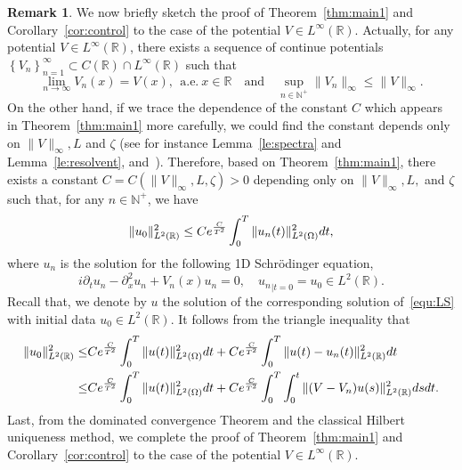 \documentclass[a4paper,reqno]{amsart}
\theoremstyle{definition}
\newtheorem{remark}[theorem]{Remark}
\numberwithin{equation}{section}
\newcommand{\R}{\mathbb{R}}
\def \R {{\mathbb{R} }}
\def \d {{\rm{d}}}
\begin{document}
\begin{remark}\label{remark:infty}
We now briefly sketch the proof of Theorem~\ref{thm:main1} and Corollary~\ref{cor:control} to the case of the potential $V\in L^{\infty}(\R)$.
Actually, for any potential $V\in L^{\infty}(\R)$, there exists a sequence of continue potentials $\left\{V_{n}\right\}_{n=1}^{\infty}\subset C(\R)\cap L^{\infty}(\R)$ such that 
\begin{equation*}
\lim_{n\to \infty}V_{n}(x)=V(x),\ \ \mbox{a.e.}\ x\in \R \quad \mbox{and}\quad \sup_{n\in \mathbb{N^{+}}}\|V_{n}\|_{{\infty}}\le \|V\|_{{\infty}}.
\end{equation*}
On the other hand, if we trace the dependence of the constant $C$ which appears in Theorem~\ref{thm:main1} more carefully, we could find the constant depends only on $\|V\|_{\infty}, L$ and $\zeta$ (see for instance Lemma~\ref{le:spectra} and Lemma~\ref{le:resolvent}, and~\cite[Proposition 4.5]{WANG}). Therefore, based on Theorem~\ref{thm:main1}, there exists a constant $C=C(\|V\|_{\infty},L,\zeta)>0$ depending only on $\|V\|_{\infty},L,$ and $\zeta$ such that, for any $n\in \mathbb{N}^{+}$, we have 
\begin{equation*}
\|u_{0}\|_{L^{2}(\R)}^{2}\le Ce^{\frac{C}{T^{2}}} \int_{0}^{T}\|u_{n}(t)\|_{L^{2}(\Omega)}^{2}\d t,
\end{equation*}
where $u_{n}$ is the solution for the following 1D Schr\"odinger equation,
\begin{equation*}
i\partial_{t}u_{n}-\partial_{x}^{2}u_{n}+V_{n}(x)u_{n}=0,\quad {u_{n}}_{|t=0}=u_{0}\in L^{2}(\R).
\end{equation*}
Recall that, we denote by $u$ the solution of the corresponding solution of~\eqref{equ:LS} with initial data $u_{0}\in L^{2}(\R)$. It follows from the triangle inequality that
\begin{equation*}
\begin{aligned}
\|u_{0}\|_{L^{2}(\R)}^{2}\le 
&Ce^{\frac{C}{T^{2}}} \int_{0}^{T}\|u(t)\|_{L^{2}(\Omega)}^{2}\d t
+Ce^{\frac{C}{T^{2}}} \int_{0}^{T}\|u(t)-u_{n}(t)\|_{L^{2}(\R)}^{2}\d t\\
\le &Ce^{\frac{C}{T^{2}}} \int_{0}^{T}\|u(t)\|_{L^{2}(\Omega)}^{2}\d t+Ce^{\frac{C}{T^{2}}} 
\int_{0}^{T}\int_{0}^{t}\|(V-V_{n})u(s)\|^{2}_{L^{2}(\R)}\d s\d t.
\end{aligned}
\end{equation*}
Last, from the dominated convergence Theorem and the classical Hilbert uniqueness method, we complete the proof of Theorem~\ref{thm:main1} and Corollary~\ref{cor:control} to the case of the potential $V\in L^{\infty}(\R)$.
\end{remark}
\end{document}
